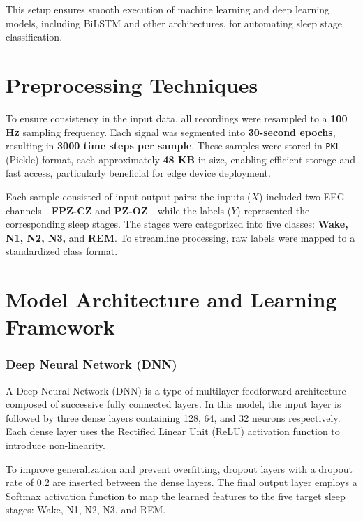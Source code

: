 This setup ensures smooth execution of machine learning and deep learning models, including BiLSTM and other architectures, for automating sleep stage classification.



\section{Preprocessing Techniques}

To ensure consistency in the input data, all recordings were resampled to a \textbf{100 Hz} sampling frequency. Each signal was segmented into \textbf{30-second epochs}, resulting in \textbf{3000 time steps per sample}. These samples were stored in \texttt{PKL} (Pickle) format, each approximately \textbf{48 KB} in size, enabling efficient storage and fast access, particularly beneficial for edge device deployment.

Each sample consisted of input-output pairs: the inputs ($X$) included two EEG channels—\textbf{FPZ-CZ} and \textbf{PZ-OZ}—while the labels ($Y$) represented the corresponding sleep stages. The stages were categorized into five classes: \textbf{Wake, N1, N2, N3,} and \textbf{REM}. To streamline processing, raw labels were mapped to a standardized class format.

\section{Model Architecture and Learning Framework}


\subsubsection{Deep Neural Network (DNN)}

A Deep Neural Network (DNN) is a type of multilayer feedforward architecture composed of successive fully connected layers. In this model, the input layer is followed by three dense layers containing 128, 64, and 32 neurons respectively. Each dense layer uses the Rectified Linear Unit (ReLU) activation function to introduce non-linearity.

To improve generalization and prevent overfitting, dropout layers with a dropout rate of 0.2 are inserted between the dense layers. The final output layer employs a Softmax activation function to map the learned features to the five target sleep stages: Wake, N1, N2, N3, and REM.

